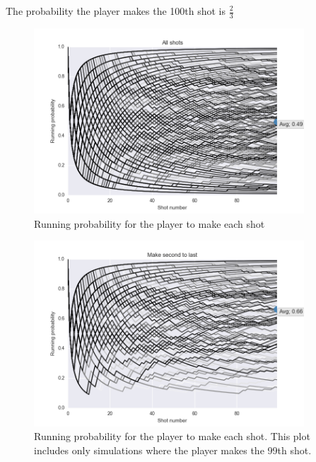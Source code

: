 \documentclass[12]{article}
\begin{document}
The probability the player makes the 100th shot is $\frac{2}{3}$

\begin{figure}
\begin{center}
  \includegraphics[width=0.9\textwidth]{figs/neurotic_basketball_player/all_shots.png}
\end{center}
\caption{Running probability for the player to make each shot}
\label{fig:}
\end{figure}

\begin{figure}
\begin{center}
  \includegraphics[width=0.9\textwidth]{figs/neurotic_basketball_player/make_99.png}
\end{center}
\caption{Running probability for the player to make each shot. This plot
         includes only simulations where the player makes the 99th shot.}
\label{fig:}
\end{figure}
\end{document}
